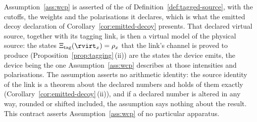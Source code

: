
\begin{remark}\label{rem:wcp-virtual-model}
Assumption~\ref{ass:wcp} is asserted of the 
of Definition~\ref{def:tagged-source}, with the cutoffs, the weights and the
polarisations it declares, which is what the emitted decoy declaration of
Corollary~\ref{cor:emitted-decoy} presents. That declared virtual source,
together with its tagging link, is then a virtual model of the physical
source: the states $\Xi_{\mathrm{tag}}(\rvirt_x)=\rho_x$ that the link's
channel is proved to produce (Proposition~\ref{prop:tagging}\,(ii)) are the
states the device emits, the device being the one
Assumption~\ref{ass:wcp} describes at those intensities and polarisations.
The assumption asserts no arithmetic identity: the source identity of the
link is a theorem about the declared numbers and holds of them exactly
(Corollary~\ref{cor:emitted-decoy}\,(ii)), and if a declared number is
altered in any way, rounded or shifted included, the assumption says nothing
about the result. This contract asserts Assumption~\ref{ass:wcp} of no
particular apparatus.
\end{remark}
